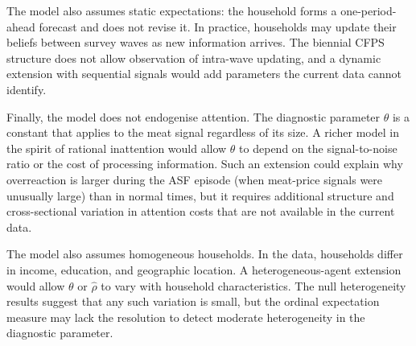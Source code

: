 The model also assumes static expectations: the household
forms a one-period-ahead forecast and does not revise it.
In practice, households may update their beliefs between
survey waves as new information arrives.
The biennial CFPS structure does not allow observation of
intra-wave updating, and a dynamic extension with sequential
signals would add parameters the current data cannot identify.

Finally, the model does not endogenise attention.
The diagnostic parameter $\theta$ is a constant that applies
to the meat signal regardless of its size.
A richer model in the spirit of rational inattention
\citep{Sims2003} would allow $\theta$ to depend on the
signal-to-noise ratio or the cost of processing information.
Such an extension could explain why overreaction is larger
during the ASF episode (when meat-price signals were
unusually large) than in normal times, but it requires
additional structure and cross-sectional variation in
attention costs that are not available in the current data.

The model also assumes homogeneous households.
In the data, households differ in income, education, and
geographic location.
A heterogeneous-agent extension would allow $\theta$ or
$\hat{\rho}$ to vary with household characteristics.
The null heterogeneity results suggest that any such
variation is small, but the ordinal expectation measure may
lack the resolution to detect moderate heterogeneity in the
diagnostic parameter.
